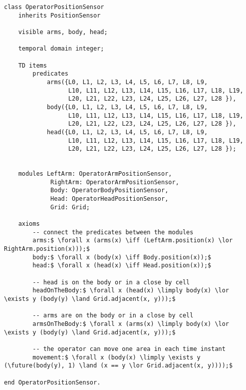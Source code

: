 \begin{lstlisting}[fontadjust, mathescape, frame=single] 
class OperatorPositionSensor
    inherits PositionSensor

    visible arms, body, head;
    
    temporal domain integer;

    TD items
        predicates
            arms({L0, L1, L2, L3, L4, L5, L6, L7, L8, L9,
                  L10, L11, L12, L13, L14, L15, L16, L17, L18, L19,
                  L20, L21, L22, L23, L24, L25, L26, L27, L28 }),
            body({L0, L1, L2, L3, L4, L5, L6, L7, L8, L9,
                  L10, L11, L12, L13, L14, L15, L16, L17, L18, L19,
                  L20, L21, L22, L23, L24, L25, L26, L27, L28 }),
            head({L0, L1, L2, L3, L4, L5, L6, L7, L8, L9,
                  L10, L11, L12, L13, L14, L15, L16, L17, L18, L19,
                  L20, L21, L22, L23, L24, L25, L26, L27, L28 });


    modules LeftArm: OperatorArmPositionSensor,
             RightArm: OperatorArmPositionSensor,
             Body: OperatorBodyPositionSensor,
             Head: OperatorHeadPositionSensor,
             Grid: Grid;

    axioms
        -- connect the predicates between the modules
        arms:$ \forall x (arms(x) \iff (LeftArm.position(x) \lor RightArm.position(x)));$
        body:$ \forall x (body(x) \iff Body.position(x));$
        head:$ \forall x (head(x) \iff Head.position(x));$

        -- head is on the body or in a close by cell
        headOnTheBody:$ \forall x (head(x) \limply body(x) \lor \exists y (body(y) \land Grid.adjacent(x, y)));$

        -- arms are on the body or in a close by cell
        armsOnTheBody:$ \forall x (arms(x) \limply body(x) \lor \exists y (body(y) \land Grid.adjacent(x, y)));$

        -- the operator can move one area in each time instant
        movement:$ \forall x (body(x) \limply \exists y (\future(body(y), 1) \land (x == y \lor Grid.adjacent(x, y))));$

end OperatorPositionSensor.
\end{lstlisting}